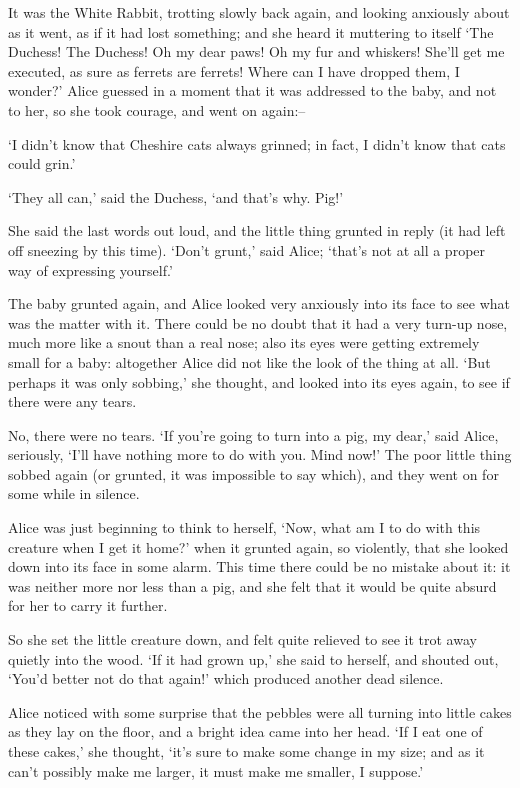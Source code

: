 \documentclass[statementpaper,twoside,openany]{memoir}
\begin{document}
It was the White Rabbit, trotting slowly back again, and looking anxiously about as it went, as if it had lost something; and she heard it muttering to itself `The Duchess! The Duchess! Oh my dear paws! Oh my fur and whiskers! She'll get me executed, as sure as ferrets are ferrets! Where can I have dropped them, I wonder?' Alice guessed in a moment that it was addressed to the baby, and not to her, so she took courage, and went on again:--

`I didn't know that Cheshire cats always grinned; in fact, I didn't know that cats could grin.'

`They all can,' said the Duchess, `and that's why. Pig!'

She said the last words out loud, and the little thing grunted in reply (it had left off sneezing by this time). `Don't grunt,' said Alice; `that's not at all a proper way of expressing yourself.'

The baby grunted again, and Alice looked very anxiously into its face to see what was the matter with it. There could be no doubt that it had a very turn-up nose, much more like a snout than a real nose; also its eyes were getting extremely small for a baby: altogether Alice did not like the look of the thing at all. `But perhaps it was only sobbing,' she thought, and looked into its eyes again, to see if there were any tears.

No, there were no tears. `If you're going to turn into a pig, my dear,' said Alice, seriously, `I'll have nothing more to do with you. Mind now!' The poor little thing sobbed again (or grunted, it was impossible to say which), and they went on for some while in silence.

Alice was just beginning to think to herself, `Now, what am I to do with this creature when I get it home?' when it grunted again, so violently, that she looked down into its face in some alarm. This time there could be no mistake about it: it was neither more nor less than a pig, and she felt that it would be quite absurd for her to carry it further.

So she set the little creature down, and felt quite relieved to see it trot away quietly into the wood. `If it had grown up,' she said to herself, and shouted out, `You'd better not do that again!' which produced another dead silence.

Alice noticed with some surprise that the pebbles were all turning into little cakes as they lay on the floor, and a bright idea came into her head. `If I eat one of these cakes,' she thought, `it's sure to make some change in my size; and as it can't possibly make me larger, it must make me smaller, I suppose.'
\end{document}
